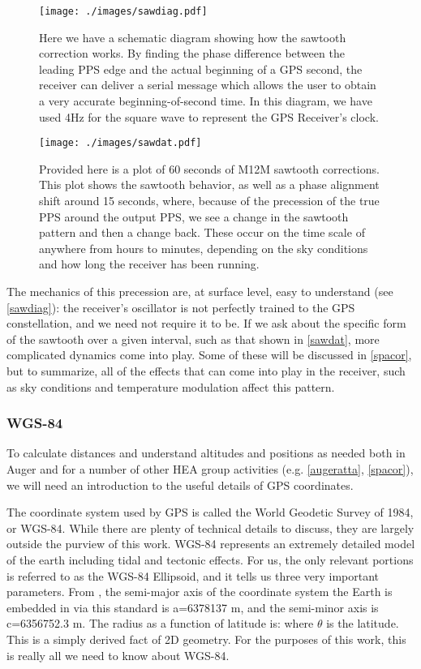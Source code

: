 \begin{figure}[h!]
\centering
\texttt{[image: ./images/sawdiag.pdf]}
\caption[Sawtooth Diagram]{Here we have a schematic diagram showing how the sawtooth correction works. By finding the phase difference between the leading PPS edge and the actual beginning of a GPS second, the receiver can deliver a serial message which allows the user to obtain a very accurate beginning-of-second time. In this diagram, we have used 4Hz for the square wave to represent the GPS Receiver's clock.}
\label{sawdiag}
\end{figure}
\begin{figure}[h!]
\centering
\texttt{[image: ./images/sawdat.pdf]}
\caption[Sawtooth Data]{Provided here is a plot of 60 seconds of M12M sawtooth corrections. This plot shows the sawtooth behavior, as well as a phase alignment shift around 15 seconds, where, because of the precession of the true PPS around the output PPS, we see a change in the sawtooth pattern and then a change back. These occur on the time scale of anywhere from hours to minutes, depending on the sky conditions and how long the receiver has been running.}
\label{sawdat}
\end{figure}
$\,$\\
The mechanics of this precession are, at surface level, easy to understand (see \autoref{sawdiag}): the receiver's oscillator is not perfectly trained to the GPS constellation, and we need not require it to be. If we ask about the specific form of the sawtooth over a given interval, such as that shown in \autoref{sawdat}, more complicated dynamics come into play. Some of these will be discussed in \autoref{spacor}, but to summarize, all of the effects that can come into play in the receiver, such as sky conditions and temperature modulation affect this pattern.
\subsubsection{WGS-84}
\label{wgs84}
To calculate distances and understand altitudes and positions as needed both in Auger and for a number of other HEA group activities (e.g. \autoref{augeratta}, \autoref{spacor}), we will need an introduction to the useful details of GPS coordinates.

The coordinate system used by GPS is called the World Geodetic Survey of 1984, or WGS-84. While there are plenty of technical details to discuss, they are largely outside the purview of this work. WGS-84 represents an extremely detailed model of the earth including tidal and tectonic effects. For us, the only relevant portions is referred to as the WGS-84 Ellipsoid, and it tells us three very important parameters. From \textcite{wgs84}, the semi-major axis of the coordinate system the Earth is embedded in via this standard is a=6378137 m, and the semi-minor axis is c=6356752.3 m. The radius as a function of latitude is:
where $\theta$ is the latitude. This is a simply derived fact of 2D geometry. For the purposes of this work, this is really all we need to know about WGS-84.
